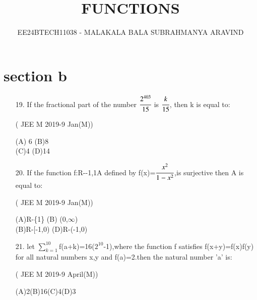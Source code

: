 \documentclass[journal,12pt,twocolumn]{IEEEtran}
\theoremstyle{remark}
\begin{document}

\vspace{3cm}

\title{FUNCTIONS}
\author{EE24BTECH11038 - MALAKALA BALA SUBRAHMANYA ARAVIND}
\maketitle
\newpage
\bigskip

\renewcommand{\thefigure}{\theenumi}
\renewcommand{\thetable}{\theenumi}
\section{section b}
\begin{enumerate}
\item[19.]If the fractional part of the number $\cfrac{2^{403}}{15}$ is $\cfrac{k}{15}$, then k is equal to:

  \hfill {( JEE M 2019-9 Jan(M))}

   (A) 6   \hspace{2cm} (B)8\\

   (C)4  \hspace{2cm}  (D)14\\

\item[20.] If the function f:R-{-1,1}A defined by f(x)=$\cfrac{x^2}{1-x^2}$,is surjective then A is equal to:

   \hfill {( JEE M 2019-9 Jan(M))}

 (A)R-\{1\}  \hspace{2cm}  (B) (0,$\infty$)\\

 (B)R-[-1,0) \hspace{2cm}  (D)R-(-1,0)\\

    \item[21.] let $\sum\limits_{k=1}^{10}$f(a+k)=16($2^{10}$-1),where the function f satisfies f(x+y)=f(x)f(y) for all natural numbers x,y and f(a)=2.then the natural number 'a' is:

    \hfill {( JEE M 2019-9 April(M))}

    (A)2\hspace{1cm}(B)16\hspace{1cm}(C)4\hspace{1cm}(D)3
    
     
     
  \end{enumerate}
\end{document}
